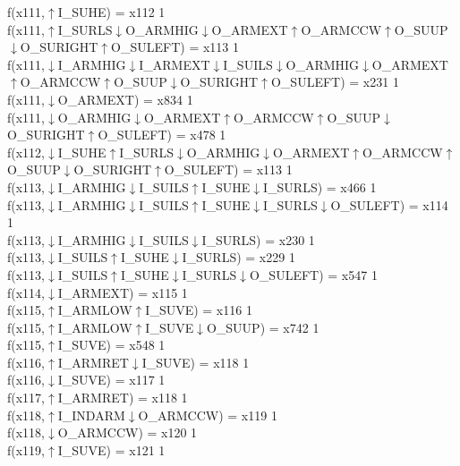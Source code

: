 f(x111,$\uparrow$I\_SUHE) = x112 {1} \\
f(x111,$\uparrow$I\_SURLS$\downarrow$O\_ARMHIG$\downarrow$O\_ARMEXT$\uparrow$O\_ARMCCW$\uparrow$O\_SUUP$\downarrow$O\_SURIGHT$\uparrow$O\_SULEFT) = x113 {1} \\
f(x111,$\downarrow$I\_ARMHIG$\downarrow$I\_ARMEXT$\downarrow$I\_SUILS$\downarrow$O\_ARMHIG$\downarrow$O\_ARMEXT$\uparrow$O\_ARMCCW$\uparrow$O\_SUUP$\downarrow$O\_SURIGHT$\uparrow$O\_SULEFT) = x231 {1} \\
f(x111,$\downarrow$O\_ARMEXT) = x834 {1} \\
f(x111,$\downarrow$O\_ARMHIG$\downarrow$O\_ARMEXT$\uparrow$O\_ARMCCW$\uparrow$O\_SUUP$\downarrow$O\_SURIGHT$\uparrow$O\_SULEFT) = x478 {1} \\
f(x112,$\downarrow$I\_SUHE$\uparrow$I\_SURLS$\downarrow$O\_ARMHIG$\downarrow$O\_ARMEXT$\uparrow$O\_ARMCCW$\uparrow$O\_SUUP$\downarrow$O\_SURIGHT$\uparrow$O\_SULEFT) = x113 {1} \\
f(x113,$\downarrow$I\_ARMHIG$\downarrow$I\_SUILS$\uparrow$I\_SUHE$\downarrow$I\_SURLS) = x466 {1} \\
f(x113,$\downarrow$I\_ARMHIG$\downarrow$I\_SUILS$\uparrow$I\_SUHE$\downarrow$I\_SURLS$\downarrow$O\_SULEFT) = x114 {1} \\
f(x113,$\downarrow$I\_ARMHIG$\downarrow$I\_SUILS$\downarrow$I\_SURLS) = x230 {1} \\
f(x113,$\downarrow$I\_SUILS$\uparrow$I\_SUHE$\downarrow$I\_SURLS) = x229 {1} \\
f(x113,$\downarrow$I\_SUILS$\uparrow$I\_SUHE$\downarrow$I\_SURLS$\downarrow$O\_SULEFT) = x547 {1} \\
f(x114,$\downarrow$I\_ARMEXT) = x115 {1} \\
f(x115,$\uparrow$I\_ARMLOW$\uparrow$I\_SUVE) = x116 {1} \\
f(x115,$\uparrow$I\_ARMLOW$\uparrow$I\_SUVE$\downarrow$O\_SUUP) = x742 {1} \\
f(x115,$\uparrow$I\_SUVE) = x548 {1} \\
f(x116,$\uparrow$I\_ARMRET$\downarrow$I\_SUVE) = x118 {1} \\
f(x116,$\downarrow$I\_SUVE) = x117 {1} \\
f(x117,$\uparrow$I\_ARMRET) = x118 {1} \\
f(x118,$\uparrow$I\_INDARM$\downarrow$O\_ARMCCW) = x119 {1} \\
f(x118,$\downarrow$O\_ARMCCW) = x120 {1} \\
f(x119,$\uparrow$I\_SUVE) = x121 {1} \\
